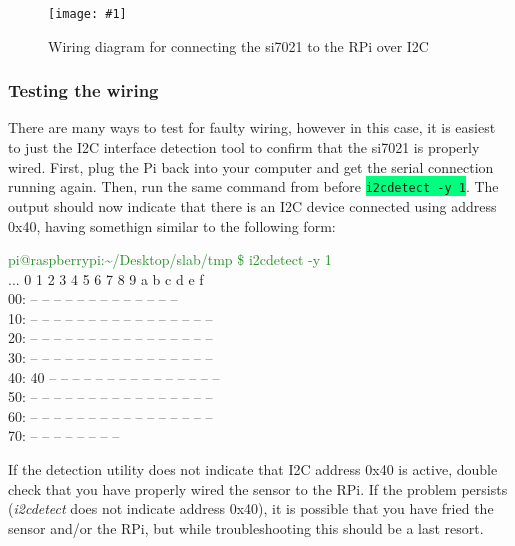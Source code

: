 \documentclass{article}
\newcommand*{\myfont}{\fontfamily{pcr}\selectfont}
\newcommand{\codei}[1]{\colorbox{SpringGreen}{\texttt{#1}}} %
\newcommand{\outputb}[2]{
  \begin{tcolorbox}[width=\textwidth,colback={light-gray},title={#1},colbacktitle=gray,coltitle=light-gray]
    \myfont
    #2
  \end{tcolorbox}
} %
\newcommand{\imagefigb}[2]{
    \begin{figure}[H]
        \centering
        \texttt{[image: \#1]}
        \caption{#2}
    \end{figure}
}
\begin{document}
    \imagefigb{si7021-wiring-diagram.png}{Wiring diagram for connecting the si7021 to the RPi over I2C}

  \subsubsection{Testing the wiring}
  There are many ways to test for faulty wiring, however in this case, it is easiest to just the I2C interface detection tool to confirm that the si7021 is properly wired. First, plug the Pi back into your computer and get the serial connection running again. Then, run the same command from before \codei{i2cdetect -y 1}. The output should now indicate that there is an I2C device connected using address 0x40, having somethign similar to the following form:
  \outputb{I2C detection output (si7021 wired)}
  {
    \textcolor{ForestGreen}{pi@raspberrypi:\textasciitilde/Desktop/slab/tmp \$ i2cdetect -y 1} \\
    ...  0  1  2  3  4  5  6  7  8  9  a  b  c  d  e  f \\
    00:          -- -- -- -- -- -- -- -- -- -- -- -- -- \\
    10: -- -- -- -- -- -- -- -- -- -- -- -- -- -- -- -- \\
    20: -- -- -- -- -- -- -- -- -- -- -- -- -- -- -- -- \\
    30: -- -- -- -- -- -- -- -- -- -- -- -- -- -- -- -- \\
    40: 40 -- -- -- -- -- -- -- -- -- -- -- -- -- -- -- \\
    50: -- -- -- -- -- -- -- -- -- -- -- -- -- -- -- -- \\
    60: -- -- -- -- -- -- -- -- -- -- -- -- -- -- -- -- \\
    70: -- -- -- -- -- -- -- --
  }

  If the detection utility does not indicate that I2C address 0x40 is active, double check that you have properly wired the sensor to the RPi. If the problem persists (\textit{i2cdetect} does not indicate address 0x40), it is possible that you have fried the sensor and/or the RPi, but while troubleshooting this should be a last resort.
\end{document}
